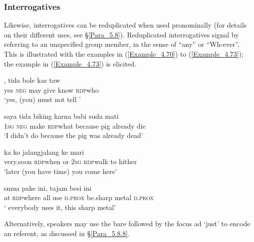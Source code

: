 {\subsubsection[Interrogatives]{Interrogatives}
\label{Para_4.2.5.3}
Likewise, interrogatives can be reduplicated when used pronominally (for details on their different uses, see §\ref{Para_5.8}). Reduplicated interrogatives signal  by referring to an unspecified group member, in the sense of ``any'' or ``Wh-ever''. This is illustrated with the examples in (\ref{Example_4.70}) to (\ref{Example_4.73}); the example in (\ref{Example_4.73}) is elicited.


\ea
\label{Example_4.70}
, {tida} {bole} {kas} {taw} {}\\ %
 yes  \textsc{neg}  may  give  know  \textsc{rdp}{\Tilde}who\\
\glt 
‘yes, (you) must not tell ’ \textstyleExampleSource{[080922-001a-CvPh.0288]}
\z

\ea
\label{Example_4.71}
 \gll saya  tida  biking    karna  babi  suda  mati\\
 \textsc{1sg}  \textsc{neg}  make  \textsc{rdp}{\Tilde}what  because  pig  already  die\\
 ‘I didn’t do  because the pig was already dead’ \textstyleExampleSource{[080919-004-NP.0023]}
\z

\ea
\label{Example_4.72}
 {} {ka} {ko} {jalang{\Tilde}jalang} {ke} {mari}\\ %
 very.soon  \textsc{rdp}{\Tilde}when  or  \textsc{2sg}  \textsc{rdp}{\Tilde}walk  to  hither\\
\glt 
‘later  (you have time) you come here’ \textstyleExampleSource{[Elicited BR120813.029]}
\z

\ea
\label{Example_4.73}
 {} {smua} {pake} {ini}, {tajam} {besi} {ini}\\ %
 at  \textsc{rdp}{\Tilde}where  all  use  \textsc{d.prox}  be.sharp  metal  \textsc{d.prox}\\
 ‘ everybody uses it, this sharp metal’ \textstyleExampleSource{[081014-006-CvPr.0059]}
\z


Alternatively, speakers may use the bare  followed by the focus ad  ‘just’ to encode an  referent, as discussed in §\ref{Para_5.8.8}.


}
